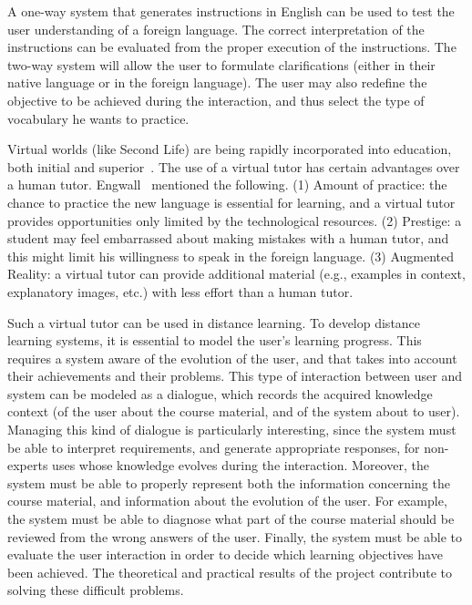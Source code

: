 A one-way system that generates instructions in English can be used to test the
user understanding of a foreign language. The correct interpretation of the
instructions can be evaluated from the proper execution of the instructions. The
two-way system will allow the user to formulate clarifications (either in their
native language or in the foreign language). The user may also redefine the
objective to be achieved during the interaction, and thus select the type of
vocabulary he wants to practice.

Virtual worlds (like Second Life) are being rapidly incorporated into
education, both initial and superior~\cite{Doswell05,molk:lear09}. The use of a
virtual tutor has certain advantages over a human tutor.
Engwall~ mentioned the following. (1) Amount of
practice: the chance to practice the new language is essential for learning, and
a virtual tutor provides opportunities only limited by the
technological resources. (2) Prestige: a student
may feel embarrassed about making mistakes with a human tutor, and this
might limit his willingness to speak in the foreign language. (3) Augmented
Reality: a virtual
tutor can provide additional material (e.g., examples in context, explanatory
images, etc.) with less effort than a human tutor.


Such a virtual tutor can be used in distance learning. To develop distance learning systems, it is essential to model the user's learning
progress. This requires a system aware of the evolution of the
user, and that takes into account their achievements and their problems. This type
of interaction between user and system can be modeled as a dialogue, which
records the acquired knowledge context (of the user about the course material, and
of the system about to user). Managing this kind of dialogue is particularly interesting,
since the system must be able to interpret requirements, and generate
appropriate responses, for non-experts uses whose knowledge evolves during the
interaction. Moreover, the system must be able to properly represent both the
information concerning the course material, and information about the
evolution of the user. For example, the system must be able to diagnose what
part of the course material should be reviewed from the wrong answers of the
user. Finally, the system must be able to evaluate the user interaction in order
to decide which learning objectives have been achieved. The theoretical and practical
results of the project contribute to solving these difficult
problems.








